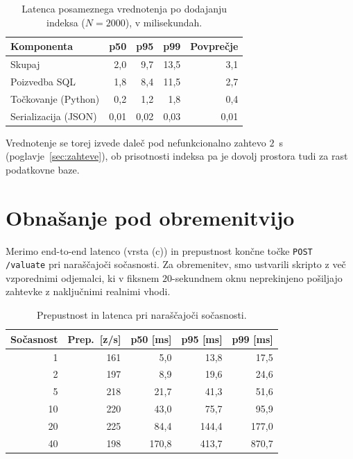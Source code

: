 \begin{table}[htbp]
  \centering
  \caption{Latenca posameznega vrednotenja po dodajanju indeksa
  ($N = 2000$), v milisekundah.}
  \label{tab:latenca-vrednotenja}
  \begin{tabular}{lrrrr}
    \toprule
    \textbf{Komponenta} & \textbf{p50} & \textbf{p95} & \textbf{p99} & \textbf{Povprečje} \\
    \midrule
    Skupaj                & 2{,}0  & 9{,}7 & 13{,}5 & 3{,}1 \\
    Poizvedba SQL         & 1{,}8  & 8{,}4 & 11{,}5 & 2{,}7 \\
    Točkovanje (Python)   & 0{,}2  & 1{,}2 & 1{,}8  & 0{,}4 \\
    Serializacija (JSON)  & 0{,}01 & 0{,}02 & 0{,}03 & 0{,}01 \\
    \bottomrule
  \end{tabular}
\end{table}

Vrednotenje se torej izvede daleč pod nefunkcionalno zahtevo $2$~s
(poglavje~\ref{sec:zahteve}), ob prisotnosti indeksa pa je dovolj prostora tudi
za rast podatkovne baze.

\section{Obnašanje pod obremenitvijo}
\label{sec:obremenitev}

Merimo end-to-end latenco (vrsta (c)) in prepustnost končne točke
\texttt{POST /valuate} pri naraščajoči sočasnosti. Za obremenitev, smo ustvarili
skripto z več vzporednimi odjemalci, ki v
fiksnem $20$-sekundnem oknu neprekinjeno pošiljajo zahtevke z naključnimi
realnimi vhodi.

\begin{table}[htbp]
  \centering
  \caption{Prepustnost in latenca pri naraščajoči sočasnosti.}
  \label{tab:obremenitev}
  \begin{tabular}{r r r r r}
    \toprule
    \textbf{Sočasnost} & \textbf{Prep.\ [z/s]} & \textbf{p50 [ms]} & \textbf{p95 [ms]} & \textbf{p99 [ms]} \\
    \midrule
    1  & 161 & 5{,}0   & 13{,}8  & 17{,}5  \\
    2  & 197 & 8{,}9   & 19{,}6  & 24{,}6  \\
    5  & 218 & 21{,}7  & 41{,}3  & 51{,}6  \\
    10 & 220 & 43{,}0  & 75{,}7  & 95{,}9  \\
    20 & 225 & 84{,}4  & 144{,}4 & 177{,}0 \\
    40 & 198 & 170{,}8 & 413{,}7 & 870{,}7 \\
    \bottomrule
  \end{tabular}
\end{table}

